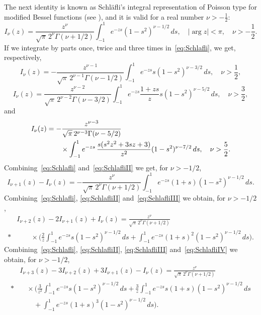 \documentclass[11pt]{amsart}
\numberwithin{equation}{section}
\theoremstyle{plain}
\theoremstyle{remark}
\begin{document}
The next identity is known as Schl\"afli's integral
representation of Poisson type for modified Bessel functions (see \cite[(5.10.22)]{Lebedev}), and it is valid for a real number $\nu>-\frac12$:
\begin{equation}
\label{eq:Schlafli}
I_{\nu}(z) = \frac{z^{\nu}}{\sqrt{\pi}\,2^{\nu}\Gamma(\nu+1/2)}
\int_{-1}^1e^{-zs} (1-s^2)^{\nu-1/2}\,ds, \quad
|\arg z|<\pi, \quad \nu>-\frac12.
\end{equation}
If we integrate by parts once, twice and three times in~\eqref{eq:Schlafli}, we get, respectively,
\begin{equation}
\label{eq:SchlafliII}
I_{\nu}(z) = -\frac{z^{\nu-1}}{\sqrt{\pi}\,2^{\nu-1}\Gamma(\nu-1/2)}
\int_{-1}^1e^{-zs} s(1-s^2)^{\nu-3/2}\,ds, \quad \nu>\frac12,
\end{equation}
\begin{equation}
\label{eq:SchlafliIII}
I_{\nu}(z)=\frac{z^{\nu-2}}{\sqrt{\pi}\,2^{\nu-2}\Gamma(\nu-3/2)}
\int_{-1}^1e^{-zs} \frac{1+zs}{z}s(1-s^2)^{\nu-5/2}\,ds, \quad \nu>\frac32,
\end{equation}
and
\begin{align}
\label{eq:SchlafliIV}
I_{\nu}(z) &= -\frac{z^{\nu-3}}{\sqrt{\pi}\,2^{\nu-3}\Gamma(\nu-5/2)} \\*
\notag& \qquad \times \int_{-1}^1 e^{-zs} \,\frac{s(s^2z^2+3sz+3)}{z^2}(1-s^2)^{\nu-7/2}\,ds,
\quad \nu>\frac52.
\end{align}
Combining~\eqref{eq:Schlafli} and~\eqref{eq:SchlafliII} we get, for $\nu>-1/2$,
\begin{equation}
\label{eq:difIs}
I_{\nu+1}(z)-I_\nu(z)
= -\frac{z^{\nu}}{\sqrt{\pi}\,2^{\nu}\Gamma(\nu+1/2)}  \int_{-1}^1e^{-zs} (1+s)(1-s^2)^{\nu-1/2}\,ds.
\end{equation}
Combining~\eqref{eq:Schlafli}, \eqref{eq:SchlafliII} and~\eqref{eq:SchlafliIII} we obtain, for $\nu>-1/2$,
\begin{equation}
\label{eq:difIs3terms}
\begin{aligned}
& I_{\nu+2}(z)-2I_{\nu+1}(z)+I_{\nu}(z)
= \frac{z^{\nu}}{\sqrt{\pi}\,2^{\nu}\Gamma(\nu+1/2)} \\*
& \qquad\times \Big(\frac{2}{z}
\int_{-1}^1e^{-zs} s(1-s^2)^{\nu-1/2}\,ds
+ \int_{-1}^1e^{-zs} (1+s)^2(1-s^2)^{\nu-1/2}\,ds \Big).
\end{aligned}
\end{equation}
Combining~\eqref{eq:Schlafli}, \eqref{eq:SchlafliII}, \eqref{eq:SchlafliIII} and~\eqref{eq:SchlafliIV} we obtain, for $\nu>-1/2$,
\begin{equation}
\label{eq:difIs4terms}
\begin{aligned}
&I_{\nu+3}(z)-3I_{\nu+2}(z)+3I_{\nu+1}(z)-I_\nu(z)
= \frac{z^{\nu}}{\sqrt{\pi}\,2^{\nu} \Gamma(\nu+1/2)} \\*
&\quad\times \Big(\frac{3}{z^2}
\int_{-1}^1e^{-zs} s(1-s^2)^{\nu-1/2}\,ds
+ \frac{3}{z}\int_{-1}^1e^{-zs} s(1+s)(1-s^2)^{\nu-1/2}\,ds \\
&\qquad + \int_{-1}^1e^{-zs} (1+s)^3(1-s^2)^{\nu-1/2}\,ds \Big).
\end{aligned}
\end{equation}
\end{document}
